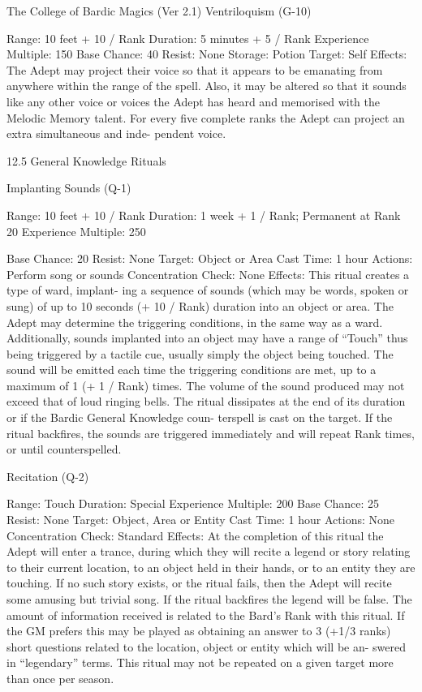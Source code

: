 \begin{Chapter}{The College of Bardic Magics (Ver 2.1)}
Ventriloquism (G-10) 

Range: 10 feet + 10 / Rank 
Duration: 5 minutes + 5 / Rank 
Experience Multiple: 150 
Base Chance: 40%
Resist: None 
Storage: Potion 
Target: Self 
Effects:  The  Adept  may  project their  voice  so  that 
it  appears  to  be  emanating  from  anywhere  within 
the  range  of  the  spell.  Also,  it  may  be  altered  so 
that  it  sounds  like  any  other  voice  or  voices  the 
Adept  has  heard  and  memorised  with  the  Melodic 
Memory  talent.  For  every  five  complete  ranks  the 
Adept can project an extra simultaneous and inde-
pendent voice. 

12.5 General Knowledge Rituals 

Implanting Sounds (Q-1) 

Range: 10 feet + 10 / Rank 
Duration:  1  week  +  1  /  Rank;  Permanent  at  Rank 
20 
Experience Multiple: 250 

Base Chance: 20%
Resist: None 
Target: Object or Area 
Cast Time: 1 hour 
Actions: Perform song or sounds 
Concentration Check: None 
Effects: This ritual creates a type of ward, implant-
ing  a  sequence  of  sounds  (which  may  be  words, 
spoken or sung) of up to 10 seconds (+ 10 / Rank) 
duration  into  an  object  or  area.  The  Adept  may 
determine  the  triggering  conditions,  in  the  same 
way as a ward. Additionally, sounds implanted into 
an object may have a range of “Touch” thus being 
triggered by a tactile cue, usually simply the object 
being  touched.  The  sound  will  be  emitted  each 
time  the  triggering  conditions  are  met,  up  to  a 
maximum of 1 (+ 1 / Rank) times. The volume of 
the  sound  produced  may  not  exceed  that  of  loud 
ringing bells. The ritual dissipates at the end of its 
duration or if the Bardic General Knowledge coun-
terspell is cast on the target. If the ritual backfires, 
the  sounds  are  triggered  immediately  and  will 
repeat Rank times, or until counterspelled. 

Recitation (Q-2) 

Range: Touch 
Duration: Special 
Experience Multiple: 200 
Base Chance: 25%
Resist: None 
Target: Object, Area or Entity 
Cast Time: 1 hour 
Actions: None 
Concentration Check: Standard 
Effects:  At  the  completion  of  this  ritual  the  Adept 
will enter a trance, during which they  will recite a 
legend or story relating to their current location, to 
an  object  held  in  their  hands,  or  to  an  entity  they 
are  touching.  If  no  such  story  exists,  or  the  ritual 
fails,  then  the  Adept  will  recite  some  amusing but 
trivial  song.  If  the  ritual  backfires  the  legend  will 
be  false.  The  amount  of  information  received  is 
related  to  the  Bard’s  Rank  with  this  ritual.  If  the 
GM  prefers  this  may  be  played  as  obtaining  an 
answer to 3 (+1/3 ranks) short questions related to 
the  location,  object  or  entity  which  will  be  an-
swered  in  “legendary”  terms.  This  ritual  may  not 
be  repeated  on  a  given  target  more  than  once  per 
season. 


\end{Chapter}
